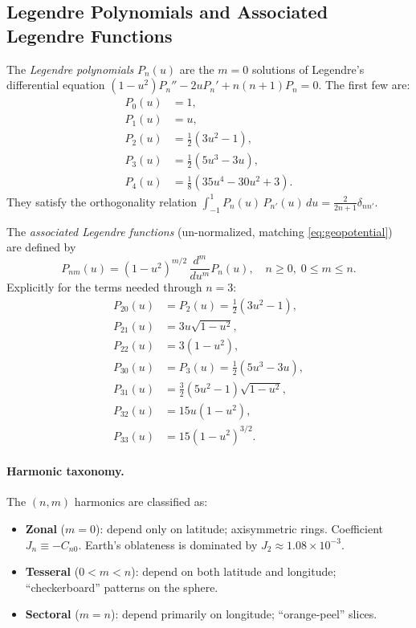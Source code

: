 \documentclass[11pt]{article}
\begin{document}
\subsection{Legendre Polynomials and Associated Legendre Functions}
\label{ssec:legendre}

The \emph{Legendre polynomials} $P_n(u)$ are the $m=0$ solutions of Legendre's
differential equation $(1-u^2)P_n'' - 2uP_n' + n(n+1)P_n = 0$.  The first few
are:
\begin{align}
  P_0(u) &= 1,\label{eq:P0}\\
  P_1(u) &= u,\label{eq:P1}\\
  P_2(u) &= \tfrac{1}{2}(3u^2-1),\label{eq:P2}\\
  P_3(u) &= \tfrac{1}{2}(5u^3-3u),\label{eq:P3}\\
  P_4(u) &= \tfrac{1}{8}(35u^4-30u^2+3).\label{eq:P4}
\end{align}
They satisfy the orthogonality relation
$\int_{-1}^1 P_n(u)\,P_{n'}(u)\,du = \tfrac{2}{2n+1}\delta_{nn'}$.

The \emph{associated Legendre functions} (un-normalized, matching
\eqref{eq:geopotential}) are defined by
\begin{equation}
  P_{nm}(u) = (1-u^2)^{m/2}\,\frac{d^m}{du^m}P_n(u),
  \quad n \geq 0,\; 0 \leq m \leq n.
  \label{eq:Pnm-def}
\end{equation}
Explicitly for the terms needed through $n=3$:
\begin{align}
  P_{20}(u) &= P_2(u) = \tfrac{1}{2}(3u^2-1),\label{eq:P20}\\
  P_{21}(u) &= 3u\sqrt{1-u^2},\label{eq:P21}\\
  P_{22}(u) &= 3(1-u^2),\label{eq:P22}\\
  P_{30}(u) &= P_3(u) = \tfrac{1}{2}(5u^3-3u),\label{eq:P30}\\
  P_{31}(u) &= \tfrac{3}{2}(5u^2-1)\sqrt{1-u^2},\label{eq:P31}\\
  P_{32}(u) &= 15u(1-u^2),\label{eq:P32}\\
  P_{33}(u) &= 15(1-u^2)^{3/2}.\label{eq:P33}
\end{align}

\paragraph{Harmonic taxonomy.}
The $(n,m)$ harmonics are classified as:
\begin{itemize}
  \item \textbf{Zonal} ($m=0$): depend only on latitude; axisymmetric rings.
        Coefficient $J_n \equiv -C_{n0}$.  Earth's oblateness is dominated by
        $J_2 \approx 1.08\times10^{-3}$.
  \item \textbf{Tesseral} ($0 < m < n$): depend on both latitude and longitude;
        ``checkerboard'' patterns on the sphere.
  \item \textbf{Sectoral} ($m=n$): depend primarily on longitude;
        ``orange-peel'' slices.
\end{itemize}
\end{document}
